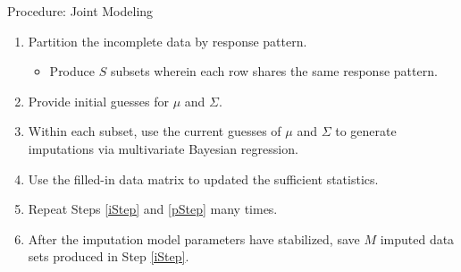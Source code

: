 \documentclass[10pt]{beamer}\usepackage[]{graphicx}\usepackage[]{color}
\begin{document}

\begin{frame}{Procedure: Joint Modeling}
  
  \begin{enumerate}
  \item Partition the incomplete data by response pattern.
    \begin{itemize}
    \item Produce $S$ subsets wherein each row shares the same response pattern.
    \end{itemize}
    \vc
  \item Provide initial guesses for $\mu$ and $\Sigma$.
    \vb
  \item Within each subset, use the current guesses of $\mu$ and $\Sigma$ to 
    generate imputations via multivariate Bayesian regression. \label{iStep}
    \vb
  \item Use the filled-in data matrix to updated the sufficient statistics.
    \label{pStep}
    \vb
  \item Repeat Steps \ref{iStep} and \ref{pStep} many times.
    \vb
  \item After the imputation model parameters have stabilized, save $M$ imputed 
    data sets produced in Step \ref{iStep}.
  \end{enumerate}
  
\end{frame}

\watermarkoff %
\end{document}

